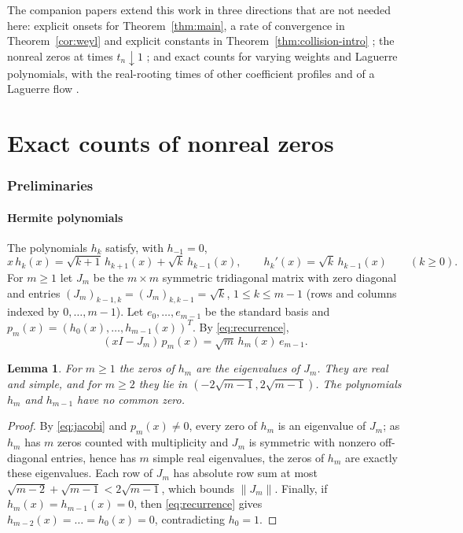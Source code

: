 \documentclass[11pt]{amsart}
\newtheorem{lemma}[theorem]{Lemma}
\theoremstyle{definition}
\theoremstyle{remark}
\numberwithin{equation}{section}
\begin{document}
The companion papers extend this work in three directions that are not needed here: explicit onsets for Theorem~\ref{thm:main}, a rate of convergence in Theorem~\ref{cor:weyl} and explicit constants in Theorem~\ref{thm:collision-intro} \cite{CompA}; the nonreal zeros at times $t_n\downarrow1$ \cite{CompB}; and exact counts for varying weights and Laguerre polynomials, with the real-rooting times of other coefficient profiles and of a Laguerre flow \cite{CompC}.

\clearpage
\part{Exact counts of nonreal zeros}

\section{Preliminaries}\label{sec:prelim}

\subsection{Hermite polynomials}
The polynomials $h_k$ satisfy, with $h_{-1}=0$,
\begin{equation}\label{eq:recurrence}
x\,h_k(x)=\sqrt{k+1}\,h_{k+1}(x)+\sqrt k\,h_{k-1}(x),\qquad h_k'(x)=\sqrt k\,h_{k-1}(x)\qquad(k\ge0).
\end{equation}
For $m\ge1$ let $J_m$ be the $m\times m$ symmetric tridiagonal matrix with zero diagonal and entries $(J_m)_{k-1,k}=(J_m)_{k,k-1}=\sqrt k$, $1\le k\le m-1$ (rows and columns indexed by $0,\dots,m-1$). Let $e_0,\dots,e_{m-1}$ be the standard basis and $p_m(x)=(h_0(x),\dots,h_{m-1}(x))^T$. By \eqref{eq:recurrence},
\begin{equation}\label{eq:jacobi}
(xI-J_m)\,p_m(x)=\sqrt m\,h_m(x)\,e_{m-1}.
\end{equation}

\begin{lemma}\label{lem:zeros}
For $m\ge1$ the zeros of $h_m$ are the eigenvalues of $J_m$. They are real and simple, and for $m\ge2$ they lie in $(-2\sqrt{m-1},2\sqrt{m-1})$. The polynomials $h_m$ and $h_{m-1}$ have no common zero.
\end{lemma}

\begin{proof}
By \eqref{eq:jacobi} and $p_m(x)\neq0$, every zero of $h_m$ is an eigenvalue of $J_m$; as $h_m$ has $m$ zeros counted with multiplicity and $J_m$ is symmetric with nonzero off-diagonal entries, hence has $m$ simple real eigenvalues, the zeros of $h_m$ are exactly these eigenvalues. Each row of $J_m$ has absolute row sum at most $\sqrt{m-2}+\sqrt{m-1}<2\sqrt{m-1}$, which bounds $\|J_m\|$. Finally, if $h_m(x)=h_{m-1}(x)=0$, then \eqref{eq:recurrence} gives $h_{m-2}(x)=\dots=h_0(x)=0$, contradicting $h_0=1$.
\end{proof}
\end{document}
